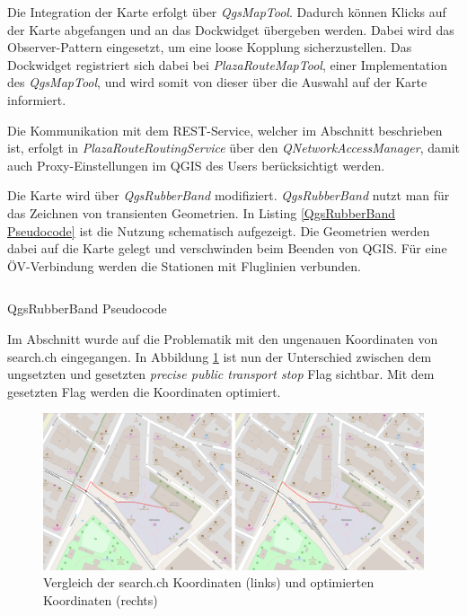 Die Integration der Karte erfolgt über \emph{QgsMapTool}. Dadurch können Klicks auf der Karte abgefangen und an das Dockwidget übergeben werden. Dabei wird das Observer-Pattern \cite{gof_patterns} eingesetzt, um eine loose Kopplung sicherzustellen. Das Dockwidget registriert sich dabei bei \emph{PlazaRouteMapTool}, einer Implementation des \emph{QgsMapTool}, und wird somit von dieser über die Auswahl auf der Karte informiert.

Die Kommunikation mit dem \ac{REST}-Service, welcher im Abschnitt  beschrieben ist, erfolgt in \emph{PlazaRouteRoutingService} über den \emph{QNetworkAccessManager}, damit auch Proxy-Einstellungen im QGIS des Users berücksichtigt werden.

Die Karte wird über \emph{QgsRubberBand} modifiziert. \emph{QgsRubberBand} nutzt man für das Zeichnen von transienten Geometrien. In Listing \ref{QgsRubberBand Pseudocode} ist die Nutzung schematisch aufgezeigt. Die Geometrien werden dabei auf die Karte gelegt und verschwinden beim Beenden von QGIS. Für eine ÖV-Verbindung werden die Stationen mit Fluglinien verbunden.

\begin{listing}[ht]
    \inputminted{python}{projectdoc/listing/rubber_band.py}
    \caption{QgsRubberBand Pseudocode}
    \label{QgsRubberBand Pseudocode}
\end{listing}

Im Abschnitt  wurde auf die Problematik mit den ungenauen Koordinaten von search.ch \cite{search_ch_route_api} eingegangen. In Abbildung \ref{fig:precise_public_transport_stops_comparison} ist nun der Unterschied zwischen dem ungsetzten und gesetzten \emph{precise public transport stop} Flag sichtbar. Mit dem gesetzten Flag werden die Koordinaten optimiert.

\begin{figure}[ht]
\centering
\includegraphics[width=1.0\linewidth]{projectdoc/img/precise_public_transport_stops_comparison}
\caption[Vergleich search.ch Koordinaten und optimierte Koordinaten]{Vergleich der search.ch Koordinaten (links) und optimierten Koordinaten (rechts)}
\label{fig:precise_public_transport_stops_comparison}
\end{figure}

